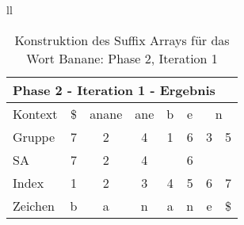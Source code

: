 \begin{table}[H]
\begin{adjustbox}{max width=\textwidth}
\begin{tabular}{ll}
\begin{tabular}{lccccccc}
\multicolumn{8}{l}{Phase 2 - Iteration 1 - Ergebnis}                                                                                                                                                                                       \\ \hline
\multicolumn{1}{l|}{Kontext} & \multicolumn{1}{c|}{\$} & \multicolumn{1}{c|}{anane}                     & \multicolumn{1}{c|}{ane}                       & \multicolumn{1}{c|}{b} & \multicolumn{1}{c|}{e}                         & \multicolumn{2}{c}{n}   \\
\multicolumn{1}{l|}{Gruppe}  & \multicolumn{1}{c|}{7}  & \multicolumn{1}{c|}{2}                         & \multicolumn{1}{c|}{4}                         & \multicolumn{1}{c|}{1} & \multicolumn{1}{c|}{6}                         & 3 & 5  \\ 
\multicolumn{1}{l|}{SA}      & \multicolumn{1}{c|}{7}  & \multicolumn{1}{c|}{\cellcolor[HTML]{\yellow}2} & \multicolumn{1}{c|}{\cellcolor[HTML]{\yellow}4} & \multicolumn{1}{c|}{}  & \multicolumn{1}{c|}{\cellcolor[HTML]{\yellow}6} &   &    \\ \hline
\multicolumn{1}{l|}{Index}   & 1                       & 2                                              & 3                                              & 4                      & 5                                              & 6 & 7  \\
\multicolumn{1}{l|}{Zeichen} & b                       & a                                              & n                                              & a                      & n                                              & e & \$
\end{tabular}

\end{tabular}
\end{adjustbox}

\caption[Konstruktion des Suffix Arrays für das Wort Banane: Phase 2, Iteration 1]{Konstruktion des Suffix Arrays für das Wort Banane: Phase 2, Iteration 1}
\label{fig_banane_2_1} 
\end{table}
